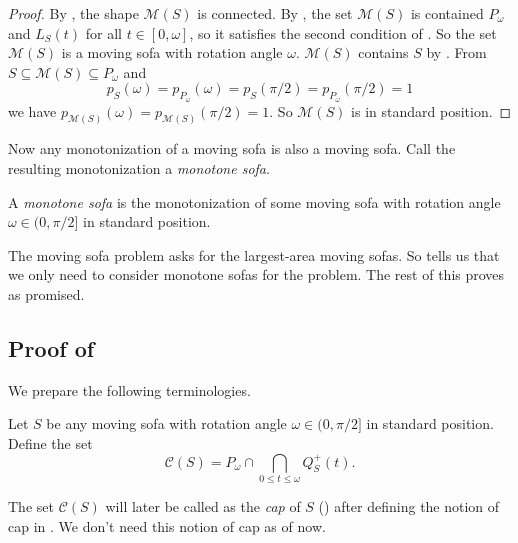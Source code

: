 \begin{proof}
By , the shape \(\mathcal{M}(S)\) is connected. By , the set \(\mathcal{M}(S)\) is contained \(P_\omega\) and \(L_S(t)\) for all \(t \in [0, \omega]\), so it satisfies the second condition of . So the set \(\mathcal{M}(S)\) is a moving sofa with rotation angle \(\omega\). \(\mathcal{M}(S)\) contains \(S\) by . From \(S \subseteq \mathcal{M}(S) \subseteq P_\omega\) and
\[
p_S(\omega) = p_{P_\omega}(\omega) = p_S(\pi/2) = p_{P_\omega}(\pi/2) = 1
\]
we have \(p_{\mathcal{M}(S)}(\omega) = p_{\mathcal{M}(S)}(\pi/2) = 1\). So \(\mathcal{M}(S)\) is in standard position.
\end{proof}

Now any monotonization of a moving sofa is also a moving sofa. Call the resulting monotonization a \emph{monotone sofa}.

\begin{definition}

A \emph{monotone sofa} is the monotonization of some moving sofa with rotation angle \(\omega \in (0, \pi/2]\) in standard position.

\label{def:monotone-sofa}
\end{definition}

The moving sofa problem asks for the largest-area moving sofas. So  tells us that we only need to consider monotone sofas for the problem. The rest of this  proves  as promised.

\subsection{Proof of }

We prepare the following terminologies.

\begin{definition}

Let \(S\) be any moving sofa with rotation angle \(\omega \in (0, \pi/2]\) in standard position. Define the set
\[
\mathcal{C}(S) = P_\omega \cap \bigcap_{0 \leq t \leq \omega} Q^+_S(t).
\]

\label{def:cap-sofa}
\end{definition}

The set \(\mathcal{C}(S)\) will later be called as the \emph{cap} of \(S\) () after defining the notion of cap in . We don’t need this notion of cap as of now.

